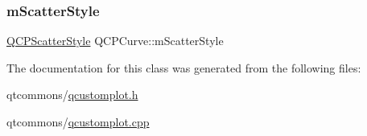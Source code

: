 \mbox{\label{class_q_c_p_curve_a08f803b4a30b01bbd7a1eab15d0f864f}} 
\subsubsection{\texorpdfstring{mScatterStyle}{mScatterStyle}}
{\footnotesize\ttfamily \mbox{\hyperlink{class_q_c_p_scatter_style}{Q\+C\+P\+Scatter\+Style}} Q\+C\+P\+Curve\+::m\+Scatter\+Style\hspace{0.3cm}{\ttfamily [protected]}}



The documentation for this class was generated from the following files\+:\begin{DoxyCompactItemize}
\item 
qtcommons/\mbox{\hyperlink{qcustomplot_8h}{qcustomplot.\+h}}\item 
qtcommons/\mbox{\hyperlink{qcustomplot_8cpp}{qcustomplot.\+cpp}}\end{DoxyCompactItemize}
